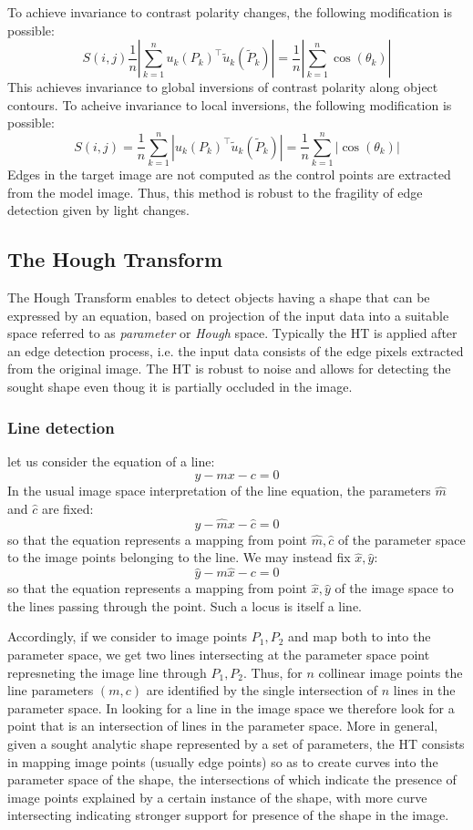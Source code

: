 \documentclass{article}
\begin{document}
To achieve invariance to contrast polarity changes, the following modification is possible:
\[
    S(i,j) \displaystyle\frac{1}{n} \left|\displaystyle\sum_{k=1}^{n}u_k(P_k)^\top \tilde{u}_k(\tilde{P}_k) \right| = \displaystyle\frac{1}{n} \left|\displaystyle\sum_{k=1}^{n}\cos(\theta_k)\right|
\]
This achieves invariance to global inversions of contrast polarity along object contours. To acheive invariance to local inversions, the following modification is possible:
\[
    S(i,j) = \displaystyle\frac{1}{n} \displaystyle\sum_{k=1}^{n}\left|u_k(P_k)^\top \tilde{u}_k(\tilde{P}_k) \right| = \displaystyle\frac{1}{n} \displaystyle\sum_{k=1}^{n}\left|\cos(\theta_k)\right|
\]
Edges in the target image are not computed as the control points are extracted from the model image. Thus, this method is robust to the fragility of edge detection given  by light changes.
\subsection{The Hough Transform}
The Hough Transform enables to detect objects having a shape that can be expressed by an equation, based on projection of the input data into a suitable space referred to as \emph{parameter} or \emph{Hough} space. Typically the HT is applied after an edge detection process, i.e. the input data consists of the edge pixels extracted from the original image. 
The HT is robust to noise and allows for detecting the sought shape even thoug it is partially occluded in the image.
\subsubsection{Line detection}
let us consider the equation of a line:
\[
    y-mx-c = 0
\]
In the usual image space interpretation of the line equation, the parameters $\hat{m}$ and $\hat{c}$ are fixed:
\[
    y-\hat{m}x-\hat{c} = 0
\]
so that the equation represents a mapping from point $\hat{m}, \hat{c}$ of the parameter space to the image points belonging to the line. We may instead fix $\hat{x}, \hat{y}$:
\[
    \hat{y}-m\hat{x}-c = 0
\] 
so that the equation represents a mapping from point $\hat{x}, \hat{y}$ of the image space to the lines passing through the point. Such a locus is itself a line. 

Accordingly, if we consider to image points $P_1, P_2$ and map both to into the parameter space, we get two lines intersecting at the parameter space point represneting the image line through $P_1, P_2$. Thus, for $n$ collinear image points the line parameters $(m,c)$ are identified by the single intersection of $n$ lines in the parameter space. In looking for a line in the image space we therefore look for a point that is an intersection of lines in the parameter space. More in general, given a sought analytic shape represented by a set of parameters, the HT consists in mapping image points (usually edge points) so as to create curves into the parameter space of the shape, the intersections of which indicate the presence of image points explained by a certain instance of the shape, with more curve intersecting indicating stronger support for presence of the shape in the image.
\end{document}
